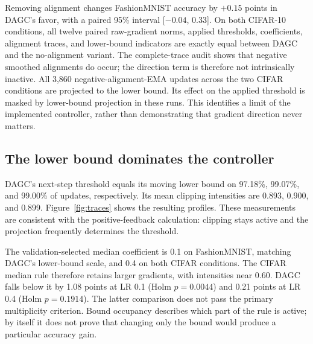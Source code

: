 Removing alignment changes FashionMNIST accuracy by $+0.15$ points in DAGC's
favor, with a paired 95\% interval [$-0.04$, 0.33]. On both CIFAR-10
conditions, all twelve paired raw-gradient norms, applied thresholds,
coefficients, alignment traces, and lower-bound indicators are exactly equal
between DAGC and the no-alignment variant. The complete-trace audit shows that negative smoothed alignments do occur;
the direction term is therefore not intrinsically inactive. All 3,860
negative-alignment-EMA updates across the two CIFAR conditions are projected
to the lower bound. Its effect on
the applied threshold is masked by lower-bound projection in these runs.
This identifies a limit of the implemented controller, rather than
demonstrating that gradient direction never matters.

\subsection{The lower bound dominates the controller}
DAGC's next-step threshold equals its moving lower bound on 97.18\%, 99.07\%,
and 99.00\% of updates, respectively. Its mean clipping intensities are
0.893, 0.900, and 0.899. Figure~\ref{fig:traces} shows the resulting profiles.
These measurements are consistent with the positive-feedback calculation:
clipping stays active and the projection frequently determines the threshold.

The validation-selected median coefficient is 0.1 on FashionMNIST, matching
DAGC's lower-bound scale, and 0.4 on both CIFAR conditions. The CIFAR median
rule therefore retains larger gradients, with intensities near 0.60. DAGC
falls below it by 1.08 points at LR 0.1 (Holm $p=0.0044$) and 0.21 points
at LR 0.4 (Holm $p=0.1914$). The latter comparison does not pass the primary
multiplicity criterion. Bound occupancy describes which part of the rule
is active; by itself it does not prove that changing only the bound would
produce a particular accuracy gain.
